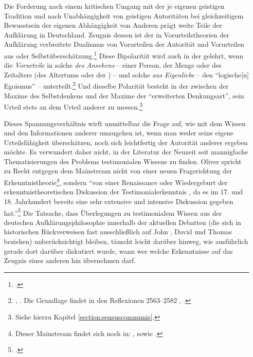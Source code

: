 Die Forderung nach einem kritischen Umgang mit der je
eigenen geistigen Tradition und nach Unabhängigkeit von geistigen Autoritäten
bei gleichzeitigem Bewusstsein der eigenen Abhängigkeit von Anderen prägt weite
Teile der Aufklärung in Deutschland.
Zeugnis dessen ist der in Vorurteilstheorien der Aufklärung verbreitete
Dualismus von Vorurteilen der Autorität und Vorurteilen aus
 oder
Selbstüberschätzung.\footnote{\cite[Vgl.][245--246]{Albrecht:ChristianThomasius1999}.}
Diese Bipolarität wird auch in der {\jaeschelogik}
gelehrt, wenn  die \emph{Vorurteile} in solche
\emph{des Ansehens} -- einer Person, der Menge oder des Zeitalters (des
Altertums oder der ) -- und solche \emph{aus Eigenliebe}
-- den \enquote{logische[n] Egoismus} --
unterteilt.\footnote{\cite[Vgl.][A~119--125]{Kant:ImmanuelKantsLogik1977},
\cite[][IX: 77.26--80.32]{Kant:GesammelteWerke1900ff.}. Die Grundlage findet
 in den Reflexionen 2563--2582 , \cite[][XVI:
417.12--427.4]{Kant:GesammelteWerke1900ff.}.} Und dieselbe Polarität besteht in
der  zwischen der Maxime des Selbstdenkens und
der Maxime der \enquote{erweiterten Denkungsart}, sein Urteil stets an dem
Urteil anderer zu messen.\footnote{Siehe hierzu Kapitel
\ref{section:sensuscommunis}.}


Dieses Spannungsverhältnis wirft unmittelbar die Frage auf, wie mit dem
Wissen und den Informationen anderer umzugehen ist, wenn man weder seine eigene
Urteilsfähigkeit überschätzen, noch sich leichtfertig der Autorität anderer
ergeben möchte. Es verwundert daher nicht, in der Literatur der Neuzeit seit
 mannigfache Thematisierungen des Problems testimonialen
Wissens zu finden. Oliver  spricht zu Recht entgegen dem Mainstream nicht von einer neuen
Fragerichtung der Erkenntnistheorie\footnote{Dieser Mainstream findet sich noch
in:
\cite[][529--531]{Grundmann:AnalytischeEinfuehrungindieErkenntnistheorie2008},
sowie \cite[][46]{Wilholt:SozialeErkenntnistheorie2007}.}, sondern \enquote{von
einer Renaissance oder Wiedergeburt der erkenntnistheoretischen Diskussion der
Testimonialerkenntnis \punkt , da es im 17. und 18. Jahrhundert bereits eine
sehr extensive und intensive Diskussion gegeben
hat.}\footnote{\cite[][354]{Scholz:DasZeugnisanderer2001}.} Die Tatsache, dass
Überlegungen zu testimonialem Wissen aus der deutschen Aufklärungsphilosophie
innerhalb der aktuellen Debatten (die sich in historischen Rückverweisen fast
ausschließlich auf John , David  und Thomas
 beziehen) unberücksichtigt bleiben, täuscht leicht darüber hinweg, wie ausführlich gerade
dort darüber diskutiert wurde, wann wer welche Erkenntnisse auf das Zeugnis
eines anderen hin übernehmen darf.



